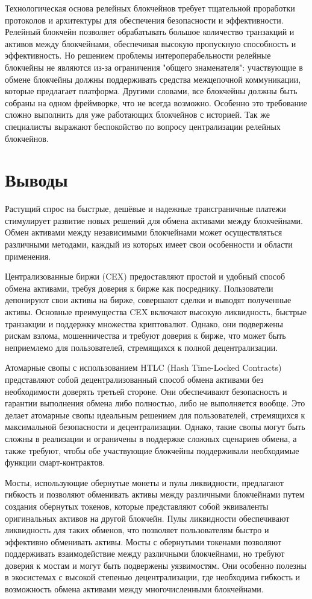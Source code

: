 Технологическая основа релейных блокчейнов требует тщательной проработки протоколов и архитектуры для обеспечения безопасности и эффективности. Релейный блокчейн позволяет обрабатывать большое количество транзакций и активов между блокчейнами, обеспечивая высокую пропускную способность и эффективность. Но решением проблемы интероперабельности релейные блокчейны не являются из-за ограничения "общего знаменателя": участвующие в обмене блокчейны должны поддерживать средства межцепочной коммуникации, которые предлагает платформа. Другими словами, все блокчейны должны быть собраны на одном фреймворке, что не всегда возможно. Особенно это требование сложно выполнить для уже работающих блокчейнов с историей. Так же специалисты выражают беспокойство по вопросу централизации релейных блокчейнов.

\section{Выводы}

Растущий спрос на быстрые, дешёвые и надежные трансграничные платежи стимулирует развитие новых решений для обмена активами между блокчейнами. Обмен активами между независимыми блокчейнами может осуществляться различными методами, каждый из которых имеет свои особенности и области применения.

Централизованные биржи (CEX) предоставляют простой и удобный способ обмена активами, требуя доверия к бирже как посреднику. Пользователи депонируют свои активы на бирже, совершают сделки и выводят полученные активы. Основные преимущества CEX включают высокую ликвидность, быстрые транзакции и поддержку множества криптовалют. Однако, они подвержены рискам взлома, мошенничества и требуют доверия к бирже, что может быть неприемлемо для пользователей, стремящихся к полной децентрализации.

Атомарные свопы с использованием HTLC (Hash Time-Locked Contracts) представляют собой децентрализованный способ обмена активами без необходимости доверять третьей стороне. Они обеспечивают безопасность и гарантии выполнения обмена либо полностью, либо не выполняется вообще. Это делает атомарные свопы идеальным решением для пользователей, стремящихся к максимальной безопасности и децентрализации. Однако, такие свопы могут быть сложны в реализации и ограничены в поддержке сложных сценариев обмена, а также требуют, чтобы обе участвующие блокчейны поддерживали необходимые функции смарт-контрактов.

Мосты, использующие обернутые монеты и пулы ликвидности, предлагают гибкость и позволяют обменивать активы между различными блокчейнами путем создания обернутых токенов, которые представляют собой эквиваленты оригинальных активов на другой блокчейн. Пулы ликвидности обеспечивают ликвидность для таких обменов, что позволяет пользователям быстро и эффективно обменивать активы. Мосты с обернутыми токенами позволяют поддерживать взаимодействие между различными блокчейнами, но требуют доверия к мостам и могут быть подвержены уязвимостям. Они особенно полезны в экосистемах с высокой степенью децентрализации, где необходима гибкость и возможность обмена активами между многочисленными блокчейнами.

